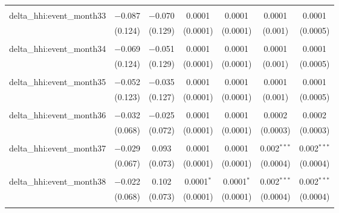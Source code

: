 \begin{table}[H]
{\begin{tabular}{@{\extracolsep{5pt}}lcccccc}
   & & & & & & \\  

  delta\_hhi:event\_month33 & $-$0.087 & $-$0.070 & 0.0001 & 0.0001 & 0.0001 & 0.0001 \\  

   & (0.124) & (0.129) & (0.0001) & (0.0001) & (0.001) & (0.0005) \\  

   & & & & & & \\  

  delta\_hhi:event\_month34 & $-$0.069 & $-$0.051 & 0.0001 & 0.0001 & 0.0001 & 0.0001 \\  

   & (0.124) & (0.129) & (0.0001) & (0.0001) & (0.001) & (0.0005) \\  

   & & & & & & \\  

  delta\_hhi:event\_month35 & $-$0.052 & $-$0.035 & 0.0001 & 0.0001 & 0.0001 & 0.0001 \\  

   & (0.123) & (0.127) & (0.0001) & (0.0001) & (0.001) & (0.0005) \\  

   & & & & & & \\  

  delta\_hhi:event\_month36 & $-$0.032 & $-$0.025 & 0.0001 & 0.0001 & 0.0002 & 0.0002 \\  

   & (0.068) & (0.072) & (0.0001) & (0.0001) & (0.0003) & (0.0003) \\  

   & & & & & & \\  

  delta\_hhi:event\_month37 & $-$0.029 & 0.093 & 0.0001 & 0.0001 & 0.002$^{***}$ & 0.002$^{***}$ \\  

   & (0.067) & (0.073) & (0.0001) & (0.0001) & (0.0004) & (0.0004) \\  

   & & & & & & \\  

  delta\_hhi:event\_month38 & $-$0.022 & 0.102 & 0.0001$^{*}$ & 0.0001$^{*}$ & 0.002$^{***}$ & 0.002$^{***}$ \\  

   & (0.068) & (0.073) & (0.0001) & (0.0001) & (0.0004) & (0.0004) \\  

   & & & & & & \\  


\end{tabular}}
\end{table}

